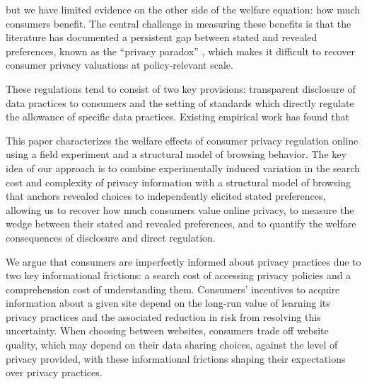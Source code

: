 \documentclass[12pt]{article}
\theoremstyle{definition}
\theoremstyle{remark}
\begin{document}
but we have limited evidence on the other side of the welfare equation: how much consumers benefit. The central challenge in measuring these benefits is that the literature has documented a persistent gap between stated and revealed preferences, known as the ``privacy paradox'' \citep{acquisti2016economics, athey2025digital}, which makes it difficult to recover consumer privacy valuations at policy-relevant scale.

These regulations tend to consist of two key provisions: transparent disclosure of data practices to consumers and the setting of standards which directly regulate the allowance of specific data practices. Existing empirical work has found that 

This paper characterizes the welfare effects of consumer privacy regulation online using a field experiment and a structural model of browsing behavior. The key idea of our approach is to combine experimentally induced variation in the search cost and complexity of privacy information with a structural model of browsing that anchors revealed choices to independently elicited stated preferences, allowing us to recover how much consumers value online privacy, to measure the wedge between their stated and revealed preferences, and to quantify the welfare consequences of disclosure and direct regulation. 

We argue that consumers are imperfectly informed about privacy practices due to two key informational frictions: a search cost of accessing privacy policies and a comprehension cost of understanding them. Consumers' incentives to acquire information about a given site depend on the long-run value of learning its privacy practices and the associated reduction in risk from resolving this uncertainty. When choosing between websites, consumers trade off website quality, which may depend on their data sharing choices, against the level of privacy provided, with these informational frictions shaping their expectations over privacy practices.
\end{document}
